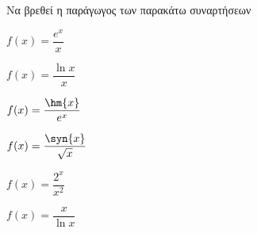 Να βρεθεί η παράγωγος των παρακάτω συναρτήσεων
\begin{multicols}{2}
\begin{alist}
\item $ f(x)=\dfrac{e^x}{x} $
\item $ f(x)=\dfrac{\ln{x}}{x} $
\item $ f(x)=\dfrac{\hm{x}}{e^x} $
\item $ f(x)=\dfrac{\syn{x}}{\sqrt{x}} $
\item $ f(x)=\dfrac{2^x}{x^2} $
\item $ f(x)=\dfrac{x}{\ln{x}} $
\end{alist}
\end{multicols}
